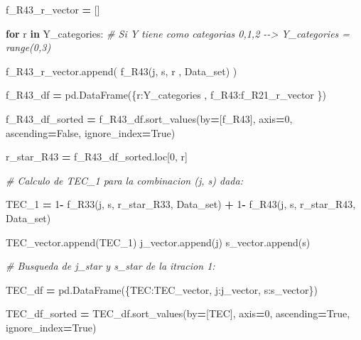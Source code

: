 \documentclass[
  11pt,
  a4paper,
]{article}
\newenvironment{Shaded}{\begin{snugshade}}{\end{snugshade}}
\newcommand{\CommentTok}[1]{\textcolor[rgb]{0.56,0.35,0.01}{\textit{#1}}}
\newcommand{\ControlFlowTok}[1]{\textcolor[rgb]{0.13,0.29,0.53}{\textbf{#1}}}
\newcommand{\DecValTok}[1]{\textcolor[rgb]{0.00,0.00,0.81}{#1}}
\newcommand{\KeywordTok}[1]{\textcolor[rgb]{0.13,0.29,0.53}{\textbf{#1}}}
\newcommand{\NormalTok}[1]{#1}
\newcommand{\OperatorTok}[1]{\textcolor[rgb]{0.81,0.36,0.00}{\textbf{#1}}}
\newcommand{\StringTok}[1]{\textcolor[rgb]{0.31,0.60,0.02}{#1}}
\newcommand{\VariableTok}[1]{\textcolor[rgb]{0.00,0.00,0.00}{#1}}
\begin{document}
\begin{Shaded}
\begin{Highlighting}[]
\NormalTok{                f\_R43\_r\_vector }\OperatorTok{=}\NormalTok{ []}

                \ControlFlowTok{for}\NormalTok{ r }\KeywordTok{in}\NormalTok{ Y\_categories:  }\CommentTok{\# Si Y tiene como categorias 0,1,2 {-}{-}\textgreater{} Y\_categories = range(0,3)}

\NormalTok{                    f\_R43\_r\_vector.append( f\_R43(j, s, r , Data\_set) )}

\NormalTok{                f\_R43\_df }\OperatorTok{=}\NormalTok{ pd.DataFrame(\{}\StringTok{\textquotesingle{}r\textquotesingle{}}\NormalTok{:Y\_categories  , }\StringTok{\textquotesingle{}f\_R43\textquotesingle{}}\NormalTok{:f\_R21\_r\_vector \})}
        
\NormalTok{                f\_R43\_df\_sorted }\OperatorTok{=}\NormalTok{ f\_R43\_df.sort\_values(by}\OperatorTok{=}\NormalTok{[}\StringTok{\textquotesingle{}f\_R43\textquotesingle{}}\NormalTok{], axis}\OperatorTok{=}\DecValTok{0}\NormalTok{, ascending}\OperatorTok{=}\VariableTok{False}\NormalTok{, ignore\_index}\OperatorTok{=}\VariableTok{True}\NormalTok{)}

\NormalTok{                r\_star\_R43 }\OperatorTok{=}\NormalTok{ f\_R43\_df\_sorted.loc[}\DecValTok{0}\NormalTok{, }\StringTok{\textquotesingle{}r\textquotesingle{}}\NormalTok{]}


                \CommentTok{\# Calculo de TEC\_1 para la combinacion (j, s) dada:}

\NormalTok{                TEC\_1 }\OperatorTok{=} \DecValTok{1}\OperatorTok{{-}}\NormalTok{ f\_R33(j, s, r\_star\_R33, Data\_set) }\OperatorTok{+} \DecValTok{1}\OperatorTok{{-}}\NormalTok{ f\_R43(j, s, r\_star\_R43, Data\_set)}

\NormalTok{                TEC\_vector.append(TEC\_1)}
\NormalTok{                j\_vector.append(j)}
\NormalTok{                s\_vector.append(s)}


        \CommentTok{\# Busqueda de j\_star y s\_star de la itracion 1:}

\NormalTok{        TEC\_df }\OperatorTok{=}\NormalTok{ pd.DataFrame(\{}\StringTok{\textquotesingle{}TEC\textquotesingle{}}\NormalTok{:TEC\_vector, }\StringTok{\textquotesingle{}j\textquotesingle{}}\NormalTok{:j\_vector, }\StringTok{\textquotesingle{}s\textquotesingle{}}\NormalTok{:s\_vector\})}

\NormalTok{        TEC\_df\_sorted }\OperatorTok{=}\NormalTok{ TEC\_df.sort\_values(by}\OperatorTok{=}\NormalTok{[}\StringTok{\textquotesingle{}TEC\textquotesingle{}}\NormalTok{], axis}\OperatorTok{=}\DecValTok{0}\NormalTok{, ascending}\OperatorTok{=}\VariableTok{True}\NormalTok{, ignore\_index}\OperatorTok{=}\VariableTok{True}\NormalTok{)}


\end{Highlighting}
\end{Shaded}
\end{document}

